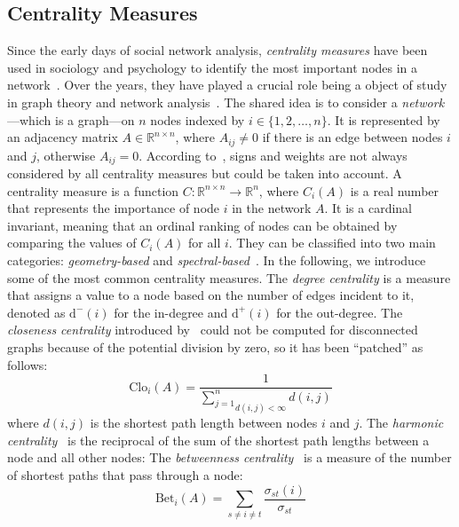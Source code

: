 \subsection{Centrality Measures}\label{subsec:bg:centrality}

Since the early days of social network analysis, \emph{centrality measures} have been used in sociology and psychology to identify the most important nodes in a network~\cite{Seeley49, Bavelas50, Katz53}.
Over the years, they have played a crucial role being a object of study in graph theory and network analysis~\cite{Borgatti05, Das18, Landherr10}.
The shared idea is to consider a \emph{network}---which is a graph---on \(n\) nodes indexed by \(i \in \{1, 2, \ldots, n\}\). It is represented by an adjacency matrix \(A \in \mathbb{R}^{n \times n}\), where \(A_{ij} \neq 0\) if there is an edge between nodes \(i\) and \(j\), otherwise \(A_{ij} = 0\).
According to~\citet{Bloch23}, signs and weights are not always considered by all centrality measures but could be taken into account.
A centrality measure is a function \(C: \mathbb{R}^{n \times n} \rightarrow \mathbb{R}^n\), where \(C_i(A)\) is a real number that represents the importance of node \(i\) in the network \(A\).
It is a cardinal invariant, meaning that an ordinal ranking of nodes can be obtained by comparing the values of \(C_i(A)\) for all \(i\).
They can be classified into two main categories: \emph{geometry-based} and \emph{spectral-based}~\cite{Boldi14}.
In the following, we introduce some of the most common centrality measures.
The \emph{degree centrality} is a measure that assigns a value to a node based on the number of edges incident to it, denoted as \(\text{d}^{-}(i)\) for the in-degree and \(\text{d}^{+}(i)\) for the out-degree. 
The \emph{closeness centrality} introduced by~\citet{Bavelas50} could not be computed for disconnected graphs because of the potential division by zero, so it has been ``patched'' as follows:
\begin{equation}
\text{Clo}_i(A) = \frac{1}{\underset{d(i, j)<\infty}{\sum_{j=1}^{n}}d(i, j)}
\end{equation}
where \(d(i, j)\) is the shortest path length between nodes \(i\) and \(j\).
The \emph{harmonic centrality}~\cite{Marchiori00} is the reciprocal of the sum of the shortest path lengths between a node and all other nodes:
The \emph{betweenness centrality}~\cite{Freeman77} is a measure of the number of shortest paths that pass through a node:
\begin{equation}
\text{Bet}_i(A) = \sum_{s\neq i\neq t}\frac{\sigma_{st}(i)}{\sigma_{st}}
\end{equation}
